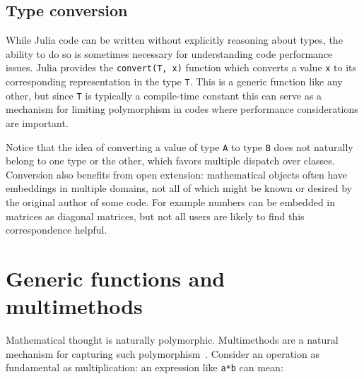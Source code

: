 \documentclass[pldi]{sigplanconf-pldi15}
\begin{document}
\subsection{Type conversion}

While Julia code can be written without
explicitly reasoning about types, the ability to do so is sometimes necessary for
understanding code performance issues. Julia provides the \verb|convert(T, x)|
function which converts a value \verb|x| to its corresponding representation in
the type \verb|T|. This is a generic function like any other, but since
\verb|T| is typically a compile-time constant this can serve as a mechanism for
limiting polymorphism in codes where performance considerations are important.

Notice that the idea of converting a value of type \verb|A| to type \verb|B|
does not naturally belong to one type or the other, which favors multiple
dispatch over classes. Conversion also benefits from open extension:
mathematical objects often have embeddings in multiple domains, not all of
which might be known or desired by the original author of some code. For
example numbers can be embedded in matrices as diagonal matrices, but not
all users are likely to find this correspondence helpful.


\section{Generic functions and multimethods}

Mathematical thought is
naturally polymorphic. Multimethods are a natural mechanism for capturing such
polymorphism~\cite{Bezanson2014b,Chen2014}. Consider an operation as
fundamental as multiplication: an expression like \verb|a*b| can mean:
\end{document}
